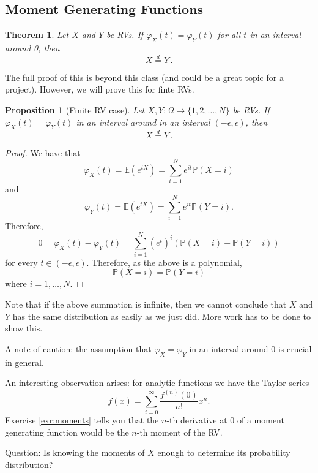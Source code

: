 \documentclass[
  openany]{book}
\newtheorem{theorem}{Theorem}[chapter]
\newtheorem{proposition}{Proposition}[chapter]
\theoremstyle{definition}
\theoremstyle{definition}
\theoremstyle{definition}
\theoremstyle{definition}
\theoremstyle{remark}
\begin{document}
\subsection{Moment Generating Functions}\label{moment-generating-functions}

\begin{theorem}
\protect\hypertarget{thm:moment-generating}{}\label{thm:moment-generating}Let \(X\) and \(Y\) be RVs. If \(\varphi_X(t) = \varphi_Y(t)\) for all \(t\) in an interval around 0, then
\[ X  \stackrel{d}{=}Y \,.\]
\end{theorem}

The full proof of this is beyond this class (and could be a great topic for a project).
However, we will prove this for finte RVs.

\begin{proposition}[Finite RV case]
Let \(X,Y: \Omega \to \{1,2, \dots, N\}\) be RVs. If \(\varphi_X(t) = \varphi_Y(t)\) in an interval around in an interval
\((-\epsilon , \epsilon)\), then
\[ X  \stackrel{d}{=}Y \,.\]
\end{proposition}

\begin{proof}
We have that
\[ \varphi_X (t) = \mathbb{E}( e^{tX}) = \sum_{i= 1}^N e^{it}\mathbb{P}( X = i) \]
and
\[ \varphi_Y (t) = \mathbb{E}( e^{tX}) = \sum_{i= 1}^N e^{it}\mathbb{P}( Y = i). \]
Therefore,
\[ 0 = \varphi_X(t) - \varphi_Y(t) = \sum_{i=1}^N (e^t)^i \left( \mathbb{P}(X = i) - \mathbb{P}(Y = i)  \right) \]
for every \(t \in (-\epsilon , \epsilon)\).
Therefore, as the above is a polynomial,
\[ \mathbb{P}( X = i) = \mathbb{P}(Y = i) \]
where \(i = 1, \dots, N\).
\end{proof}

Note that if the above summation is infinite, then we cannot conclude that \(X\) and \(Y\)
has the same distribution as easily as we just did. More work has to be done to show
this.

A note of caution: the assumption that \(\varphi_X = \varphi_Y\) in an interval around \(0\)
is crucial in general.

An interesting observation arises: for analytic functions we have the Taylor series
\[ f(x) = \sum_{i=0}^\infty \frac{f^{(n)}(0)}{n!} x^n. \]
Exercise \ref{exr:moments} tells you that the \(n\)-th derivative at \(0\)
of a moment generating function would be the \(n\)-th moment of the RV.

Question: Is knowing the moments of \(X\) enough to determine its probability distribution?
\end{document}
